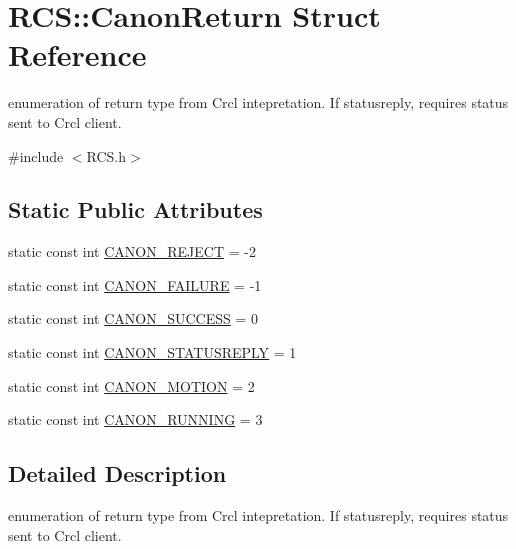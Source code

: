 \hypertarget{structRCS_1_1CanonReturn}{\section{R\-C\-S\-:\-:Canon\-Return Struct Reference}
\label{structRCS_1_1CanonReturn}
}


enumeration of return type from Crcl intepretation. If statusreply, requires status sent to Crcl client.  




{\ttfamily \#include $<$R\-C\-S.\-h$>$}

\subsection*{Static Public Attributes}
\begin{DoxyCompactItemize}
\item 
static const int \hyperlink{structRCS_1_1CanonReturn_a118c7083c30c3ef1d5614f69ab574807}{C\-A\-N\-O\-N\-\_\-\-R\-E\-J\-E\-C\-T} = -\/2
\item 
static const int \hyperlink{structRCS_1_1CanonReturn_adf9181c66f2d6438fb8e9f4cb29e4b23}{C\-A\-N\-O\-N\-\_\-\-F\-A\-I\-L\-U\-R\-E} = -\/1
\item 
static const int \hyperlink{structRCS_1_1CanonReturn_aadc6dc0f6e906c16d01680c6d85c7de4}{C\-A\-N\-O\-N\-\_\-\-S\-U\-C\-C\-E\-S\-S} = 0
\item 
static const int \hyperlink{structRCS_1_1CanonReturn_af927d2c2ce5224825b9ce0c4ba90cd1b}{C\-A\-N\-O\-N\-\_\-\-S\-T\-A\-T\-U\-S\-R\-E\-P\-L\-Y} = 1
\item 
static const int \hyperlink{structRCS_1_1CanonReturn_a3303676258442c69e197852cb1832ccc}{C\-A\-N\-O\-N\-\_\-\-M\-O\-T\-I\-O\-N} = 2
\item 
static const int \hyperlink{structRCS_1_1CanonReturn_a729c1c087b28d380a8bbf459e810a11a}{C\-A\-N\-O\-N\-\_\-\-R\-U\-N\-N\-I\-N\-G} = 3
\end{DoxyCompactItemize}


\subsection{Detailed Description}
enumeration of return type from Crcl intepretation. If statusreply, requires status sent to Crcl client. 

